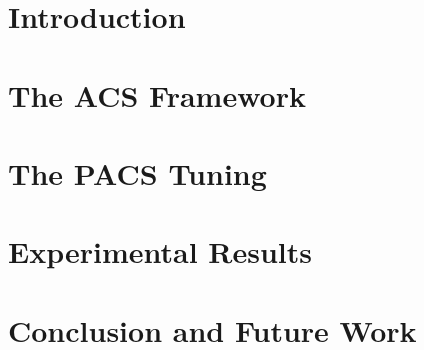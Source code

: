 \documentclass[a4paper,12pt]{report}
\newcommand\blankpage{%
    \null%
    \thispagestyle{empty}%
    \addtocounter{page}{-1}%
    \newpage}
\begin{document}
\afterpage{\blankpage}

\clearpage{\pagestyle{plain}\cleardoublepage}
\tableofcontents

\afterpage{\blankpage}

\clearpage{\pagestyle{plain}\cleardoublepage}

\clearpage{\pagestyle{plain}\cleardoublepage}
\chapter{Introduction}

\clearpage\null\newpage

\clearpage{\pagestyle{plain}\cleardoublepage}
\chapter{The ACS Framework}

\clearpage\null\newpage

\clearpage{\pagestyle{plain}\cleardoublepage}
\chapter{The PACS Tuning}

\clearpage\null\newpage

\clearpage{\pagestyle{plain}\cleardoublepage}
\chapter{Experimental Results}

\clearpage\null\newpage

\clearpage{\pagestyle{plain}\cleardoublepage}
\chapter{Conclusion and Future Work}

\clearpage\null\newpage

\printbibliography[nottype=online]
\end{document}
